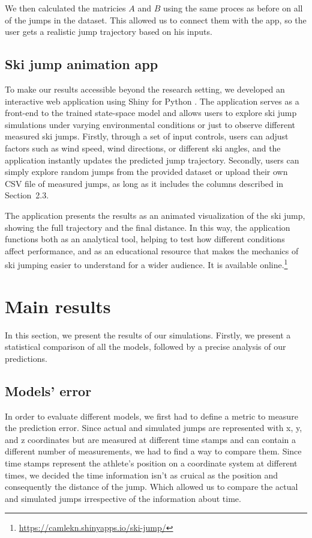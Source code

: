 \documentclass[sigconf]{acmart}
\begin{document}
We then calculated the matricies $A$ and $B$ using the same proces as before on
all of the jumps in the dataset. This allowed us to connect them with the app,
so the user gets a realistic jump trajectory based on his inputs.

\subsection{Ski jump animation app}
To make our results accessible beyond the research setting, we developed an
interactive web application using Shiny for Python \cite{posit2025}. The
application serves as a front-end to the trained state-space model and allows
users to explore ski jump simulations under varying environmental conditions or
just to observe different measured ski jumps. Firstly, through a set of input
controls, users can adjust factors such as wind speed, wind directions, or
different ski angles, and the application instantly updates the predicted jump
trajectory. Secondly, users can simply explore random jumps from the provided
dataset or upload their own CSV file of measured jumps, as long as it includes
the columns described in Section~2.3.

The application presents the results as an animated visualization of the ski
jump, showing the full trajectory and the final distance. In this way, the
application functions both as an analytical tool, helping to test how different
conditions affect performance, and as an educational resource that makes the
mechanics of ski jumping easier to understand for a wider audience. It is
available online.\footnote{\url{https://camlekn.shinyapps.io/ski-jump/}}

\section{Main results}
In this section, we present the results of our simulations. Firstly, we present
a statistical comparison of all the models, followed by a precise analysis of
our predictions.

\subsection{Models’ error}
In order to evaluate different models, we first had to define a metric to
measure the prediction error. Since actual and simulated jumps are represented
with x, y, and z coordinates but are measured at different time stamps and can
contain a different number of measurements, we had to find a way to compare
them. Since time stamps represent the athlete's position on a coordinate system 
at different times, we decided the time information isn't as cruical as the 
position and consequently the distance of the jump. Which allowed us to compare
the actual and simulated jumps irrespective of the information about time.
\end{document}

